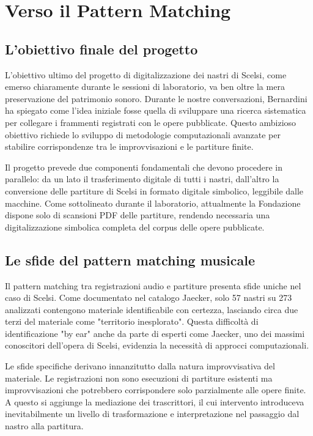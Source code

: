 \section{Verso il Pattern Matching}

\subsection{L'obiettivo finale del progetto}

L'obiettivo ultimo del progetto di digitalizzazione dei nastri di Scelsi, come emerso chiaramente durante le sessioni di laboratorio, va ben oltre la mera preservazione del patrimonio sonoro. Durante le nostre conversazioni, Bernardini ha spiegato come l'idea iniziale fosse quella di sviluppare una ricerca sistematica per collegare i frammenti registrati con le opere pubblicate. Questo ambizioso obiettivo richiede lo sviluppo di metodologie computazionali avanzate per stabilire corrispondenze tra le improvvisazioni e le partiture finite.

Il progetto prevede due componenti fondamentali che devono procedere in parallelo: da un lato il trasferimento digitale di tutti i nastri, dall'altro la conversione delle partiture di Scelsi in formato digitale simbolico, leggibile dalle macchine. Come sottolineato durante il laboratorio, attualmente la Fondazione dispone solo di scansioni PDF delle partiture, rendendo necessaria una digitalizzazione simbolica completa del corpus delle opere pubblicate.

\subsection{Le sfide del pattern matching musicale}

Il pattern matching tra registrazioni audio e partiture presenta sfide uniche nel caso di Scelsi. Come documentato nel catalogo Jaecker, solo 57 nastri su 273 analizzati contengono materiale identificabile con certezza, lasciando circa due terzi del materiale come "territorio inesplorato"\cite[p. 47]{bernardini_pellegrini_scelsi_2016}. Questa difficoltà di identificazione "by ear" anche da parte di esperti come Jaecker, uno dei massimi conoscitori dell'opera di Scelsi, evidenzia la necessità di approcci computazionali.

Le sfide specifiche derivano innanzitutto dalla natura improvvisativa del materiale. Le registrazioni non sono esecuzioni di partiture esistenti ma improvvisazioni che potrebbero corrispondere solo parzialmente alle opere finite. A questo si aggiunge la mediazione dei trascrittori, il cui intervento introduceva inevitabilmente un livello di trasformazione e interpretazione nel passaggio dal nastro alla partitura. 

